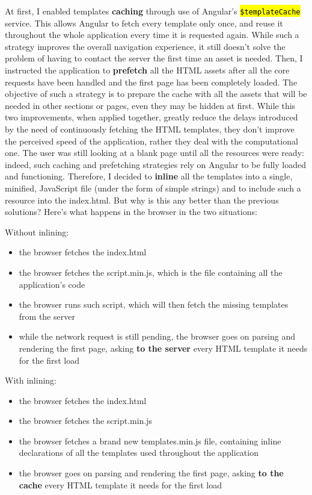 \documentclass[12pt,oneside,svgnames]{memoir}
\let\OldTexttt\texttt
\renewcommand{\texttt}[1]{\OldTexttt{\hl{#1}}}
\begin{document}
At first, I enabled templates \textbf{caching} through use of Angular's
\texttt{\$templateCache} service. This allows Angular to fetch every
template only once, and reuse it throughout the whole application every
time it is requested again. While such a strategy improves the overall
navigation experience, it still doesn't solve the problem of having to
contact the server the first time an asset is needed. Then, I instructed
the application to \textbf{prefetch} all the HTML assets after all the
core requests have been handled and the first page has been completely
loaded. The objective of such a strategy is to prepare the cache with
all the assets that will be needed in other sections or pages, even they
may be hidden at first. While this two improvements, when applied
together, greatly reduce the delays introduced by the need of
continuously fetching the HTML templates, they don't improve the
perceived speed of the application, rather they deal with the
computational one. The user was still looking at a blank page until all
the resources were ready: indeed, such caching and prefetching
strategies rely on Angular to be fully loaded and functioning.
Therefore, I decided to \textbf{inline} all the templates into a single,
minified, JavaScript file (under the form of simple strings) and to
include such a resource into the index.html. But why is this any better
than the previous solutions? Here's what happens in the browser in the
two situations:

Without inlining:

\begin{itemize}
\itemsep1pt\parskip0pt
\item
  the browser fetches the index.html
\item
  the browser fetches the script.min.js, which is the file containing
  all the application's code
\item
  the browser runs such script, which will then fetch the missing
  templates from the server
\item
  while the network request is still pending, the browser goes on
  parsing and rendering the first page, asking \textbf{to the server}
  every HTML template it needs for the first load
\end{itemize}

With inlining:

\begin{itemize}
\itemsep1pt\parskip0pt
\item
  the browser fetches the index.html
\item
  the browser fetches the script.min.js
\item
  the browser fetches a brand new templates.min.js file, containing
  inline declarations of all the templates used throughout the
  application
\item
  the browser goes on parsing and rendering the first page, asking
  \textbf{to the cache} every HTML template it needs for the first load
\end{itemize}
\end{document}
